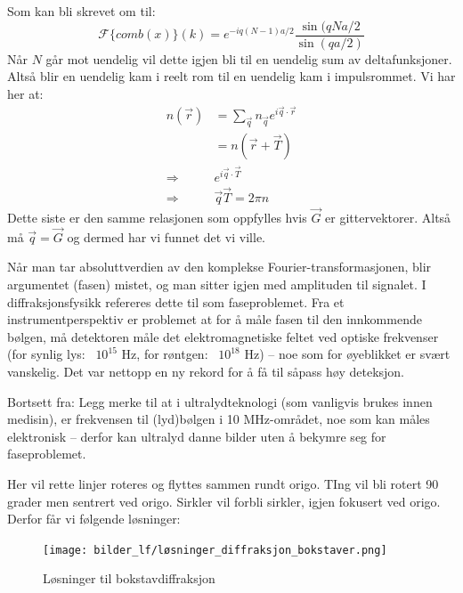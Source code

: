 \documentclass{article}
\begin{document}
Som kan bli skrevet om til:
\begin{equation}
    \mathcal{F}\{comb(x)\}(k) = e^{-iq(N-1)a/2}\frac{\sin(qNa/2}{\sin(qa/2)}
\end{equation}
Når $N$ går mot uendelig vil dette igjen bli til en uendelig sum av deltafunksjoner. Altså blir en uendelig kam i reelt rom til en uendelig kam i impulsrommet.
Vi har her at:
\begin{align}
    n(\vec{r}) &= \sum_{\vec{q}}  n_{\vec{q}}  e^{i\vec{q} \cdot \vec{r}} \\
    &= n(\vec{r} + \vec{T})\\
    \Rightarrow& e^{i \vec{q} \cdot \vec{T}}\\
    \Rightarrow& \vec{q} \vec{T} = 2\pi n
\end{align}
Dette siste er den samme relasjonen som oppfylles hvis $\vec{G}$ er gittervektorer. Altså må $\vec{q} = \vec{G}$ og dermed har vi funnet det vi ville.

Når man tar absoluttverdien av den komplekse Fourier-transformasjonen, blir argumentet (fasen) mistet, og man sitter igjen med amplituden til signalet. I diffraksjonsfysikk refereres dette til som faseproblemet. Fra et instrumentperspektiv er problemet at for å måle fasen til den innkommende bølgen, må detektoren måle det elektromagnetiske feltet ved optiske frekvenser (for synlig lys: ~$10^{15}$ Hz, for røntgen: ~$10^{18}$ Hz) – noe som for øyeblikket er svært vanskelig. Det var nettopp en ny rekord for å få til såpass høy deteksjon.

Bortsett fra: Legg merke til at i ultralydteknologi (som vanligvis brukes innen medisin), er frekvensen til (lyd)bølgen i 10 MHz-området, noe som kan måles elektronisk – derfor kan ultralyd danne bilder uten å bekymre seg for faseproblemet.

Her vil rette linjer roteres og flyttes sammen rundt origo. TIng vil bli rotert 90 grader men sentrert ved origo. Sirkler vil forbli sirkler, igjen fokusert ved origo. Derfor får vi følgende løsninger:
\begin{figure}[H]
    \centering
    \texttt{[image: bilder\_lf/løsninger\_diffraksjon\_bokstaver.png]}
    \caption{Løsninger til bokstavdiffraksjon}
    \label{fig:løsninger_diffraksjon_bokstaver}
\end{figure}
\end{document}
